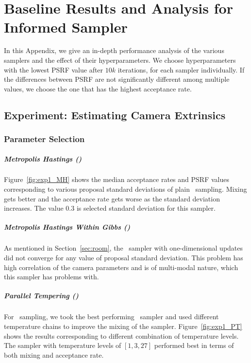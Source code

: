 \chapter{Baseline Results and Analysis for Informed Sampler}
\label{appendix:chap3}

In this Appendix, we give an in-depth
performance analysis of the various samplers and the effect of their
hyperparameters. We choose hyperparameters with the lowest PSRF value
after $10k$ iterations, for each sampler individually. If the
differences between PSRF are not significantly different among
multiple values, we choose the one that has the highest acceptance
rate.

\section{Experiment: Estimating Camera Extrinsics}
\label{appendix:chap3:room}

\subsection{Parameter Selection}
\paragraph{Metropolis Hastings (\MH)}

Figure~\ref{fig:exp1_MH} shows the median acceptance rates and PSRF
values corresponding to various proposal standard deviations of plain
\MH~sampling. Mixing gets better and the acceptance rate gets worse as
the standard deviation increases. The value $0.3$ is selected standard
deviation for this sampler.

\paragraph{Metropolis Hastings Within Gibbs (\MHWG)}

As mentioned in Section~\ref{sec:room}, the \MHWG~sampler with one-dimensional
updates did not converge for any value of proposal standard deviation.
This problem has high correlation of the camera parameters and is of
multi-modal nature, which this sampler has problems with.

\paragraph{Parallel Tempering (\PT)}

For \PT~sampling, we took the best performing \MH~sampler and used
different temperature chains to improve the mixing of the
sampler. Figure~\ref{fig:exp1_PT} shows the results corresponding to
different combination of temperature levels. The sampler with
temperature levels of $[1,3,27]$ performed best in terms of both
mixing and acceptance rate.


